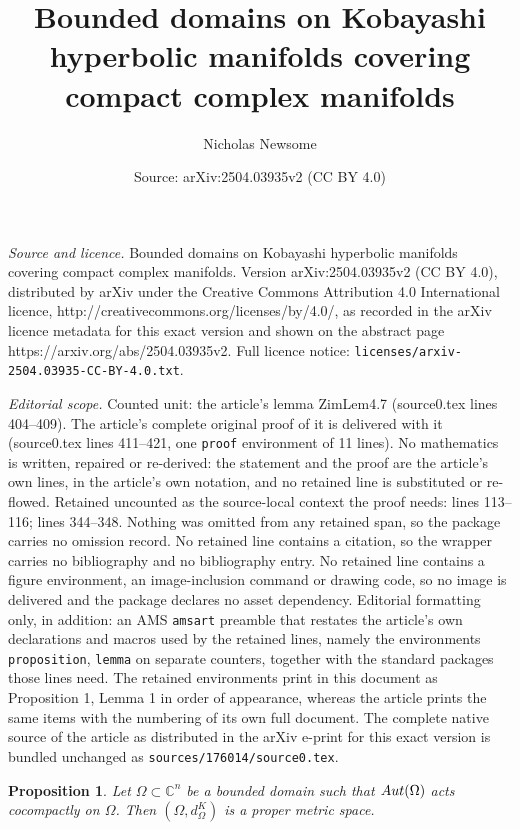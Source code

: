 \documentclass[10pt,a4paper]{amsart}
\title{Bounded domains on Kobayashi hyperbolic manifolds covering compact complex manifolds}
\author{Nicholas Newsome}
\date{Source: arXiv:2504.03935v2 (CC BY 4.0)}
\newtheorem{proposition}{Proposition}
\newcommand{\Aut}{\textup{Aut}}
\newcommand{\C}{\mathbb{C}}
\begin{document}
\maketitle

\noindent\emph{Source and licence.} Bounded domains on Kobayashi hyperbolic manifolds covering compact complex manifolds. Version arXiv:2504.03935v2 (CC BY 4.0), distributed by arXiv under the Creative Commons Attribution 4.0 International licence, http://creativecommons.org/licenses/by/4.0/, as recorded in the arXiv licence metadata for this exact version and shown on the abstract page https://arxiv.org/abs/2504.03935v2. Full licence notice: \texttt{licenses/arxiv-2504.03935-CC-BY-4.0.txt}.\par\smallskip

\noindent\textit{Editorial scope.} Counted unit: the article's lemma ZimLem4.7 (source0.tex lines 404--409). The article's complete original proof of it is delivered with it (source0.tex lines 411--421, one \texttt{proof} environment of 11 lines). No mathematics is written, repaired or re-derived: the statement and the proof are the article's own lines, in the article's own notation, and no retained line is substituted or re-flowed.  Retained uncounted as the source-local context the proof needs: lines 113--116; lines 344--348.  Nothing was omitted from any retained span, so the package carries no omission record.  No retained line contains a citation, so the wrapper carries no bibliography and no bibliography entry.  No retained line contains a figure environment, an image-inclusion command or drawing code, so no image is delivered and the package declares no asset dependency.  Editorial formatting only, in addition: an AMS \texttt{amsart} preamble that restates the article's own declarations and macros used by the retained lines, namely the environments \texttt{proposition}, \texttt{lemma} on separate counters, together with the standard packages those lines need.  The retained environments print in this document as Proposition 1, Lemma 1 in order of appearance, whereas the article prints the same items with the numbering of its own full document.  The complete native source of the article as distributed in the arXiv e-print for this exact version is bundled unchanged as \texttt{sources/176014/source0.tex}.
\begin{proposition}
\label{ZimProp3.1}
Let $\Omega\subset\C^n$ be a bounded domain such that $\Aut(\Omega)$ acts cocompactly on $\Omega$. Then $(\Omega,d^K_{\Omega})$ is a proper metric space.
\end{proposition}
\end{document}
